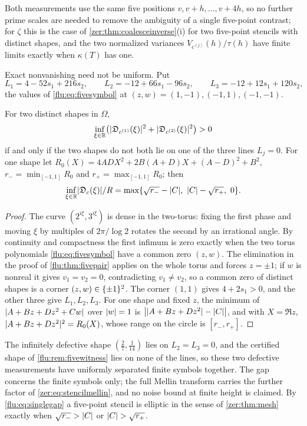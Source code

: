 Both measurements use the same five positions $v,v+h,\dots,v+4h$, so no further prime scales are needed to
remove the ambiguity of a single five-point contrast; for $\zeta$ this is the case of
\cref{zer:thm:coalesceinverse}(i) for two five-point stencils with distinct shapes, and the two normalized
variances $V_{c^{(j)}}(h)/\tau(h)$ have finite limits exactly when $\kappa(T)$ has one.

Exact nonvanishing need not be uniform. Put
\[
 L_1=4-52s_1+216s_2,\qquad L_2=-12+66s_1-96s_2,\qquad L_3=-12+12s_1+120s_2 ,
\]
the values of \eqref{flu:eq:fivesymbol} at $(z,w)=(1,-1),(-1,1),(-1,-1)$.

\begin{theorem}\label{flu:thm:fivegap}
For two distinct shapes in $\Omega$,
\[
 \inf_{\xi\in\mathbb{R}}\bigl(\lvert\mathfrak{D}_{c^{(1)}}(\xi)\rvert^2+\lvert\mathfrak{D}_{c^{(2)}}(\xi)\rvert^2\bigr)>0
\]
if and only if the two shapes do not both lie on one of the three lines $L_j=0$. For one shape let
$R_0(X)=4ADX^2+2B(A+D)X+(A-D)^2+B^2$, $r_-=\min_{[-1,1]}R_0$ and $r_+=\max_{[-1,1]}R_0$; then
\begin{equation}\label{flu:eq:singlegap}
 \inf_{\xi\in\mathbb{R}}\lvert\mathfrak{D}_c(\xi)\rvert/R=\max\{\sqrt{r_-}-\lvert C\rvert,\ \lvert C\rvert-\sqrt{r_+},\ 0\}.
\end{equation}
\end{theorem}
\begin{proof}
The curve $(2^{i\xi},3^{i\xi})$ is dense in the two-torus: fixing the first phase and moving $\xi$ by multiples of
$2\pi/\log2$ rotates the second by an irrational angle. By continuity and compactness the first infimum is zero
exactly when the two torus polynomials \eqref{flu:eq:fivesymbol} have a common zero $(z,w)$. The elimination in
the proof of \cref{flu:thm:fivepair} applies on the whole torus and forces $z=\pm1$; if $w$ is nonreal it gives
$v_1=v_2=0$, contradicting $v_1\ne v_2$, so a common zero of distinct shapes is a corner $(z,w)\in\{\pm1\}^2$.
The corner $(1,1)$ gives $4+2s_1>0$, and the other three give $L_1,L_2,L_3$. For one shape and fixed $z$, the
minimum of $\lvert A+Bz+Dz^2+Cw\rvert$ over $\lvert w\rvert=1$ is $\bigl\lvert\lvert A+Bz+Dz^2\rvert-\lvert C\rvert\bigr\rvert$, and with $X=\Re z$,
$\lvert A+Bz+Dz^2\rvert^2=R_0(X)$, whose range on the circle is $[r_-,r_+]$.
\end{proof}

The infinitely defective shape $(\tfrac27,\tfrac1{14})$ lies on $L_2=L_3=0$, and the certified shape of
\cref{flu:rem:fivewitness} lies on none of the lines, so these two defective measurements have uniformly
separated finite symbols together. The gap concerns the finite symbols only; the full Mellin transform carries
the further factor of \eqref{zer:eq:stencilmellin}, and no noise bound at finite height is claimed. By
\eqref{flu:eq:singlegap} a five-point stencil is elliptic in the sense of \cref{zer:thm:mesh} exactly when
$\sqrt{r_-}>\lvert C\rvert$ or $\lvert C\rvert>\sqrt{r_+}$.

